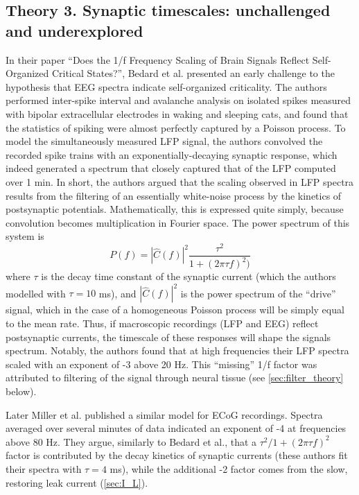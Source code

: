 \subsection{Theory 3. Synaptic timescales: unchallenged and underexplored} \label{sec:timescales}
In their paper ``Does the 1/f Frequency Scaling of Brain Signals Reflect Self-Organized Critical States?'', Bedard et al.\cite{Bedard2006} presented an early challenge to the hypothesis that EEG spectra indicate self-organized criticality. The authors performed inter-spike interval and avalanche analysis on isolated spikes measured with bipolar extracellular electrodes in waking and sleeping cats, and found that the statistics of spiking were almost perfectly captured by a Poisson process. To model the simultaneously measured LFP signal, the authors convolved the recorded spike trains with an exponentially-decaying synaptic response, which indeed generated a spectrum that closely captured that of the LFP computed over 1 min. In short, the authors argued that the scaling observed in LFP spectra results from the filtering of an essentially white-noise process by the kinetics of postsynaptic potentials. Mathematically, this is expressed quite simply, because convolution becomes multiplication in Fourier space. The power spectrum of this system is
\begin{equation}
P(f) =|\hat{C}(f)|^2 \frac{\tau^2} { 1+ (2\pi\tau f)^2)}
\end{equation}
where $\tau$ is the decay time constant of the synaptic current (which the authors modelled with $\tau=10$ \unit{\milli\second}), and $|\hat{C}(f)|^2$ is the power spectrum of the ``drive'' signal, which in the case of a homogeneous Poisson process will be simply equal to the mean rate. Thus, if macroscopic recordings (LFP and EEG) reflect postsynaptic currents, the timescale of these responses will shape the signals spectrum. Notably, the authors found that at high frequencies their LFP spectra scaled with an exponent of -3 above 20 Hz. This ``missing'' 1/f factor was attributed to filtering of the signal through neural tissue (see \autoref{sec:filter_theory} below).

Later Miller et al. \cite{Miller2009} published a similar model for ECoG recordings. Spectra averaged over several minutes of data indicated an exponent of -4 at frequencies above 80 Hz. They argue, similarly to Bedard et al., that a $\tau^2 / 1+ (2\pi\tau f)^2 $ factor is contributed by the decay kinetics of synaptic currents (these authors fit their spectra with $\tau=4$ \unit{\milli\second}), while the additional -2 factor comes from the slow, restoring leak current (\autoref{sec:I_L}).

